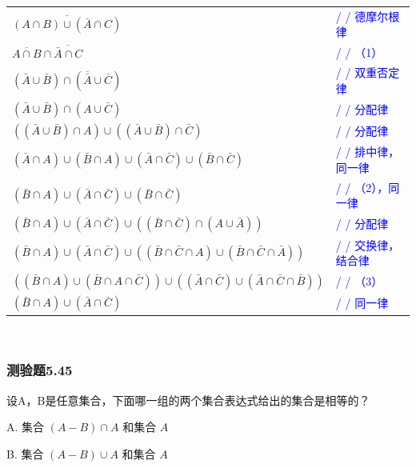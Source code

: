 \documentclass[UTF8, heading=true]{ctexart}
\begin{document}
\begin{table}[H]
  \centering
  \renewcommand{\arraystretch}{1.5}
\begin{tabular}{ll}
$\overline{(A \cap B) \cup(\bar{A} \cap C)}$ & \textcolor{blue}{/ / 德摩尔根律} \\
$\overline{A \cap B} \cap \overline{\bar{A} \cap C}$ & \textcolor{blue}{/ / （1）} \\
$(\bar{A} \cup \bar{B}) \cap(\overline{\bar{A}} \cup \bar{C})$ & \textcolor{blue}{/ / 双重否定律} \\
$(\bar{A} \cup \bar{B}) \cap(A \cup \bar{C})$ & \textcolor{blue}{/ / 分配律} \\
$((\bar{A} \cup \bar{B}) \cap A) \cup((\bar{A} \cup \bar{B}) \cap \bar{C})$ & \textcolor{blue}{/ / 分配律} \\
$(\bar{A} \cap A) \cup(\bar{B} \cap A) \cup(\bar{A} \cap \bar{C}) \cup(\bar{B} \cap \bar{C})$ & \textcolor{blue}{/ / 排中律，同一律} \\
$(\bar{B} \cap A) \cup(\bar{A} \cap \bar{C}) \cup(\bar{B} \cap \bar{C})$ & \textcolor{blue}{/ / （2），同一律} \\
$(\bar{B} \cap A) \cup(\bar{A} \cap \bar{C}) \cup((\bar{B} \cap \bar{C}) \cap(A \cup \bar{A}))$ & \textcolor{blue}{/ / 分配律} \\
$(\bar{B} \cap A) \cup(\bar{A} \cap \bar{C}) \cup((\bar{B} \cap \bar{C} \cap A) \cup(\bar{B} \cap \bar{C} \cap \bar{A}))$ & \textcolor{blue}{/ / 交换律，结合律} \\
$((\bar{B} \cap A) \cup(\bar{B} \cap A \cap \bar{C})) \cup((\bar{A} \cap \bar{C}) \cup(\bar{A} \cap \bar{C} \cap \bar{B}))$ & \textcolor{blue}{/ / （3）} \\
$(\bar{B} \cap A) \cup(\bar{A} \cap \bar{C})$ & \textcolor{blue}{/ / 同一律} \\
\end{tabular}
\end{table}



\textcolor{white}
{
  答案：（1）徳摩尔根律；德摩根律
  （2）排中律 
  （3）吸收律
}

\subsubsection{测验题5.45}

设A，B是任意集合，下面哪一组的两个集合表达式给出的集合是相等的？

A. 集合 $(A-B) \cap A$ 和集合 $A$

B. 集合 $(A-B) \cup A$ 和集合 $A$
\end{document}
